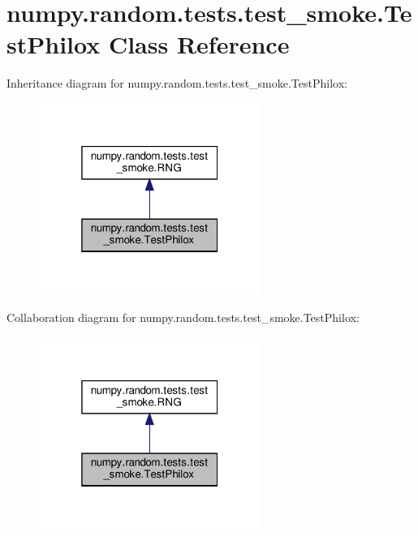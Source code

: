 \hypertarget{classnumpy_1_1random_1_1tests_1_1test__smoke_1_1TestPhilox}{}\section{numpy.\+random.\+tests.\+test\+\_\+smoke.\+Test\+Philox Class Reference}
\label{classnumpy_1_1random_1_1tests_1_1test__smoke_1_1TestPhilox}


Inheritance diagram for numpy.\+random.\+tests.\+test\+\_\+smoke.\+Test\+Philox\+:
\nopagebreak
\begin{figure}[H]
\begin{center}
\leavevmode
\includegraphics[width=205pt]{classnumpy_1_1random_1_1tests_1_1test__smoke_1_1TestPhilox__inherit__graph}
\end{center}
\end{figure}


Collaboration diagram for numpy.\+random.\+tests.\+test\+\_\+smoke.\+Test\+Philox\+:
\nopagebreak
\begin{figure}[H]
\begin{center}
\leavevmode
\includegraphics[width=205pt]{classnumpy_1_1random_1_1tests_1_1test__smoke_1_1TestPhilox__coll__graph}
\end{center}
\end{figure}

